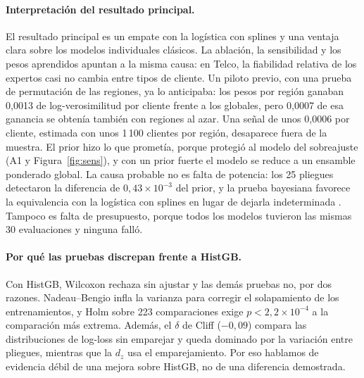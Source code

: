 \documentclass[11pt,a4paper]{article}
\begin{document}
\paragraph{Interpretación del resultado principal.} El resultado principal es un empate con la logística con splines y una ventaja clara sobre los modelos individuales clásicos. La ablación, la sensibilidad y los pesos aprendidos apuntan a la misma causa: en Telco, la fiabilidad relativa de los expertos casi no cambia entre tipos de cliente. Un piloto previo, con una prueba de permutación de las regiones, ya lo anticipaba: los pesos por región ganaban 0,0013 de log-verosimilitud por cliente frente a los globales, pero 0,0007 de esa ganancia se obtenía también con regiones al azar. Una señal de unos 0,0006 por cliente, estimada con unos 1\,100 clientes por región, desaparece fuera de la muestra. El prior hizo lo que prometía, porque protegió al modelo del sobreajuste (A1 y Figura~\ref{fig:sens}), y con un prior fuerte el modelo se reduce a un ensamble ponderado global. La causa probable no es falta de potencia: los 25 pliegues detectaron la diferencia de $0{,}43\times10^{-3}$ del prior, y la prueba bayesiana favorece la equivalencia con la logística con splines en lugar de dejarla indeterminada \cite{benavoli2017}. Tampoco es falta de presupuesto, porque todos los modelos tuvieron las mismas 30 evaluaciones y ninguna falló.

\paragraph{Por qué las pruebas discrepan frente a HistGB.} Con HistGB, Wilcoxon rechaza sin ajustar y las demás pruebas no, por dos razones. Nadeau--Bengio infla la varianza para corregir el solapamiento de los entrenamientos, y Holm sobre 223 comparaciones exige $p<2{,}2\times10^{-4}$ a la comparación más extrema. Además, el $\delta$ de Cliff ($-0{,}09$) compara las distribuciones de log-loss sin emparejar y queda dominado por la variación entre pliegues, mientras que la $d_z$ usa el emparejamiento. Por eso hablamos de evidencia débil de una mejora sobre HistGB, no de una diferencia demostrada.
\end{document}
